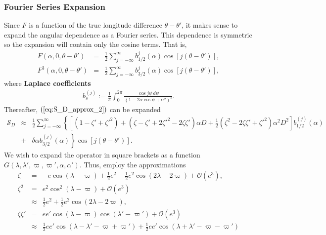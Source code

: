 \documentclass [12pt, a4paper] {article}
\begin{document}
\subsubsection{Fourier Series Expansion}
Since $F$ is a function of the true longitude difference $\theta - \theta'$, it makes sense to 
expand the angular dependence as a Fourier series. This dependence is symmetric so the expansion 
will contain only the cosine terms. That is, 
\begin {eqnarray}
    F(\alpha, 0, \theta - \theta') 
    &=&
    \frac{1}{2}\sum_{j=-\infty}^\infty
    b_{1/2}^{j}(\alpha)
    \cos[j(\theta - \theta')],
    \\
    F^3(\alpha, 0, \theta - \theta') 
    &=&
    \frac{1}{2}\sum_{j=-\infty}^\infty
    b_{3/2}^{j}(\alpha)
    \cos[j(\theta - \theta')],
\end {eqnarray}
where \textbf{Laplace coefficients}
\begin {eqnarray}
    b_s^{(j)}
    :=
    \frac{1}{\pi}\int_0^{2\pi}\frac{\cos j\psi\:d\psi}{(1 - 2\alpha\cos\psi + \alpha^2)^s}.
\end {eqnarray}
Thereafter, $(\ref{eq:S_D_approx_2})$ can be expanded
\begin {eqnarray}
    \label{eq:S_D_approx_3}
    \mathcal{S}_D 
    &\approx& 
    \frac{1}{2}
    \sum_{j=-\infty}^\infty
    \left\{
    \left[
        (1 - \zeta' + \zeta'^2) 
        + 
        (\zeta - \zeta' + 2\zeta'^2 - 2\zeta\zeta')\alpha D
        + 
        \frac{1}{2}
        (\zeta^2 - 2\zeta\zeta' + \zeta'^2)\alpha^2 D^2
    \right]b_{1/2}^{(j)}(\alpha)
    \right.
    \\ \nonumber
    &+&
    \left.
    \delta\alpha b_{3/2}^{(j)}(\alpha)
    \right\}\cos[j(\theta - \theta')].
\end {eqnarray}
We wish to expand the operator in square brackets as a function 
$G(\lambda, \lambda', \varpi, \varpi', \alpha, \alpha')$. Thus, employ the approximations
\begin {eqnarray}
    \zeta 
    &=&
    -e\cos(\lambda - \varpi)
    +
    \frac{1}{2}e^2 
    - 
    \frac{1}{2}e^2\cos(2\lambda - 2\varpi)
    + 
    \mathcal{O}(e^3),
    \\
    \zeta^2
    &=&
    e^2\cos^2(\lambda - \varpi) + \mathcal{O}(e^3)
    \\
    &\approx& 
    \frac{1}{2}e^2 + \frac{1}{2}e^2\cos(2\lambda - 2\varpi),
    \\
    \zeta\zeta' 
    &=& 
    ee'\cos(\lambda - \varpi)\cos(\lambda' - \varpi') + \mathcal{O}(e^3)
    \\
    &\approx&
    \frac{1}{2}ee'\cos(\lambda - \lambda' - \varpi + \varpi')
    +
    \frac{1}{2}ee'\cos(\lambda + \lambda' - \varpi - \varpi')
\end {eqnarray}
\end{document}
